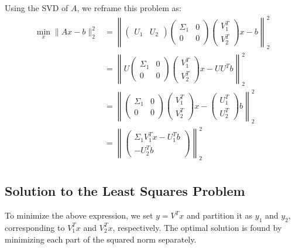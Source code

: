 \documentclass[a4paper, 12pt]{article}
\begin{document}
Using the SVD of $A$, we reframe this problem as:
\[
\begin{aligned}
    \min_x \| Ax - b \|_2^2 &=
    \left\|
        \begin{pmatrix} U_1 & U_2 \end{pmatrix}
        \begin{pmatrix} \Sigma_1 & 0 \\ 0 & 0 \end{pmatrix}
        \begin{pmatrix} V_1^T \\ V_2^T \end{pmatrix}
        x - b
    \right\|_2^2 \\
    & = \left\|
        U \begin{pmatrix}
        \Sigma_1 & 0 \\
        0 & 0 
        \end{pmatrix}
        \begin{pmatrix}
            V_1^T \\
            V_2^T
        \end{pmatrix}
        x - UU^T b
    \right\|_2^2 \\
    & = \left\|
    \begin{pmatrix}
        \Sigma_1 & 0 \\
        0 & 0 
        \end{pmatrix}
        \begin{pmatrix}
            V_1^T \\
            V_2^T
        \end{pmatrix}
        x - 
        \begin{pmatrix}
            U_1^T \\
            U_2^T
        \end{pmatrix}b
    \right\|_2^2 \\
    & = \left\|
        \begin{pmatrix}
            \Sigma_1 V_1^T x - U_1^T b\\
            - U_2^T b
        \end{pmatrix}
    \right\|_2^2 \\
\end{aligned}
\]

\subsection*{Solution to the Least Squares Problem}
To minimize the above expression, we set $y = V^T x$ and partition it as $y_1$ and $y_2$, corresponding to $V_1^T x$ and $V_2^T x$, respectively. The optimal solution is found by minimizing each part of the squared norm separately.
\end{document}
